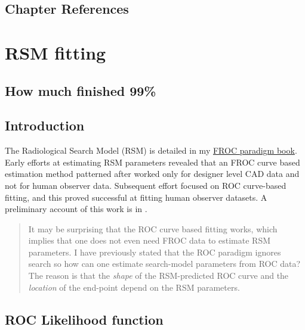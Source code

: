 \documentclass[
]{book}
\begin{document}
\hypertarget{proper-roc-models-references}{%
\section{Chapter References}\label{proper-roc-models-references}}

\hypertarget{rsm-fitting}{%
\chapter{RSM fitting}\label{rsm-fitting}}

\hypertarget{rsm-fitting-how-much-finished}{%
\section{How much finished 99\%}\label{rsm-fitting-how-much-finished}}

\hypertarget{rsm-fitting-intro}{%
\section{Introduction}\label{rsm-fitting-intro}}

The Radiological Search Model (RSM) is detailed in my \href{https://dpc10ster.github.io/RJafrocFrocBook/}{FROC paradigm book}. Early efforts at estimating RSM parameters revealed that an FROC curve based estimation method patterned after \citep{edwards2002maximum} worked only for designer level CAD data and not for human observer data. Subsequent effort focused on ROC curve-based fitting, and this proved successful at fitting human observer datasets. A preliminary account of this work is in \citep{chakraborty2011estimating}.

\begin{quote}
It may be surprising that the ROC curve based fitting works, which implies that one does not even need FROC data to estimate RSM parameters. I have previously stated that the ROC paradigm ignores search so how can one estimate search-model parameters from ROC data? The reason is that the \emph{shape} of the RSM-predicted ROC curve and the \emph{location} of the end-point depend on the RSM parameters.
\end{quote}

\hypertarget{rsm-fitting-roc-likelihood}{%
\section{ROC Likelihood function}\label{rsm-fitting-roc-likelihood}}
\end{document}
